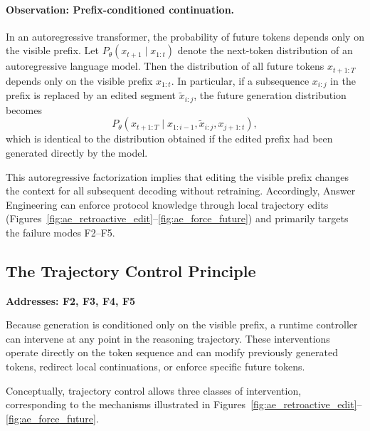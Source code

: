\documentclass[twocolumn]{article}
\begin{document}
\paragraph{Observation: Prefix-conditioned continuation.}
In an autoregressive transformer, the probability of future tokens depends only
on the visible prefix. Let $P_\theta(x_{t+1}\mid x_{1:t})$ denote the next-token
distribution of an autoregressive language model. Then the distribution of all
future tokens $x_{t+1:T}$ depends only on the visible prefix $x_{1:t}$.
In particular,
if a subsequence $x_{i:j}$ in the prefix is replaced by an edited segment
$\tilde{x}_{i:j}$, the future generation distribution becomes
\[
  P_\theta(x_{t+1:T}\mid x_{1:i-1},\tilde{x}_{i:j},x_{j+1:t}),
\]
which is identical to the distribution obtained if the edited prefix had been
generated directly by the model.

This autoregressive factorization implies that editing the visible prefix
changes the context for all subsequent decoding without retraining. Accordingly,
Answer Engineering can enforce protocol knowledge through local trajectory edits
(Figures~\ref{fig:ae_retroactive_edit}--\ref{fig:ae_force_future}) and primarily
targets the failure modes F2--F5.

\subsection{The Trajectory Control
Principle}\label{sec:trajectory_control_principle}
\textbf{Addresses: F2, F3, F4, F5}

Because generation is conditioned only on the visible prefix, a runtime
controller can intervene at any point in the reasoning trajectory. These
interventions operate directly on the token sequence and can modify previously
generated tokens, redirect local continuations, or enforce specific future
tokens.

Conceptually, trajectory control allows three classes of intervention,
corresponding to the mechanisms illustrated in
Figures~\ref{fig:ae_retroactive_edit}--\ref{fig:ae_force_future}.
\end{document}
